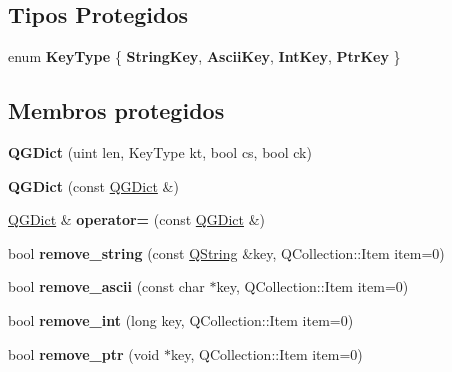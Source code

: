 \subsection*{Tipos Protegidos}
\begin{DoxyCompactItemize}
\item 
enum {\bfseries Key\-Type} \{ {\bfseries String\-Key}, 
{\bfseries Ascii\-Key}, 
{\bfseries Int\-Key}, 
{\bfseries Ptr\-Key}
 \}
\end{DoxyCompactItemize}
\subsection*{Membros protegidos}
\begin{DoxyCompactItemize}
\item 
\hypertarget{class_q_g_dict_a8d594c7d1638441f9d3ef586acf2235f}{{\bfseries Q\-G\-Dict} (uint len, Key\-Type kt, bool cs, bool ck)}\label{class_q_g_dict_a8d594c7d1638441f9d3ef586acf2235f}

\item 
\hypertarget{class_q_g_dict_a8005673a68d1df06cb54d6f1effed770}{{\bfseries Q\-G\-Dict} (const \hyperlink{class_q_g_dict}{Q\-G\-Dict} \&)}\label{class_q_g_dict_a8005673a68d1df06cb54d6f1effed770}

\item 
\hypertarget{class_q_g_dict_aabd3c6bd32379a2737d1b98d12ea621d}{\hyperlink{class_q_g_dict}{Q\-G\-Dict} \& {\bfseries operator=} (const \hyperlink{class_q_g_dict}{Q\-G\-Dict} \&)}\label{class_q_g_dict_aabd3c6bd32379a2737d1b98d12ea621d}

\item 
\hypertarget{class_q_g_dict_a4eaa1cac33f6bc6c2a9b7324e21637d8}{bool {\bfseries remove\-\_\-string} (const \hyperlink{class_q_string}{Q\-String} \&key, Q\-Collection\-::\-Item item=0)}\label{class_q_g_dict_a4eaa1cac33f6bc6c2a9b7324e21637d8}

\item 
\hypertarget{class_q_g_dict_ac1a29e78ce0d465c648bb189c043ce0d}{bool {\bfseries remove\-\_\-ascii} (const char $\ast$key, Q\-Collection\-::\-Item item=0)}\label{class_q_g_dict_ac1a29e78ce0d465c648bb189c043ce0d}

\item 
\hypertarget{class_q_g_dict_a7a8bc7d50505a2643cabb58c932a3264}{bool {\bfseries remove\-\_\-int} (long key, Q\-Collection\-::\-Item item=0)}\label{class_q_g_dict_a7a8bc7d50505a2643cabb58c932a3264}

\item 
\hypertarget{class_q_g_dict_acf41923d7a1234d3cd6d73712c419001}{bool {\bfseries remove\-\_\-ptr} (void $\ast$key, Q\-Collection\-::\-Item item=0)}\label{class_q_g_dict_acf41923d7a1234d3cd6d73712c419001}


\end{DoxyCompactItemize}
